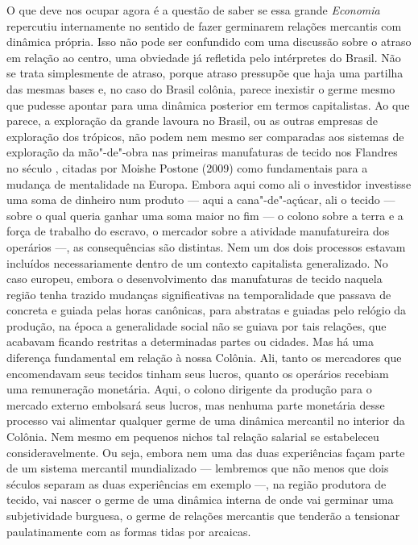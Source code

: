O que deve nos ocupar agora é a questão de saber se essa grande \emph{Economia}
repercutiu internamente no sentido de fazer germinarem relações
mercantis com dinâmica própria. Isso não pode ser confundido com uma
discussão sobre o atraso em relação ao centro, uma obviedade já
refletida pelo intérpretes do Brasil. Não se trata simplesmente de
atraso, porque atraso pressupõe que haja uma partilha das mesmas bases
e, no caso do Brasil colônia, parece inexistir o germe mesmo que pudesse
apontar para uma dinâmica posterior em termos capitalistas. Ao que
parece, a exploração da grande lavoura no Brasil, ou as outras empresas
de exploração dos trópicos, não podem nem mesmo ser comparadas aos
sistemas de exploração da mão"-de"-obra nas primeiras manufaturas de
tecido nos Flandres no século , citadas por Moishe Postone (2009)
como fundamentais para a mudança de mentalidade na Europa. Embora aqui
como ali o investidor investisse uma soma de dinheiro num produto ---
aqui a cana"-de"-açúcar, ali o tecido --- sobre o qual queria ganhar uma
soma maior no fim --- o colono sobre a terra e a força de trabalho do
escravo, o mercador sobre a atividade manufatureira dos operários ---, as
consequências são distintas. Nem um dos dois processos estavam incluídos
necessariamente dentro de um contexto capitalista generalizado. No caso
europeu, embora o desenvolvimento das manufaturas de tecido naquela
região tenha trazido mudanças significativas na temporalidade que
passava de concreta e guiada pelas horas canônicas, para abstratas e
guiadas pelo relógio da produção, na época a generalidade social não se
guiava por tais relações, que acabavam ficando restritas a determinadas
partes ou cidades. Mas há uma diferença fundamental em relação à nossa
Colônia. Ali, tanto os mercadores que encomendavam seus tecidos tinham
seus lucros, quanto os operários recebiam uma remuneração monetária.
Aqui, o colono dirigente da produção para o mercado externo embolsará
seus lucros, mas nenhuma parte monetária desse processo vai alimentar
qualquer germe de uma dinâmica mercantil no interior da Colônia. Nem
mesmo em pequenos nichos tal relação salarial se estabeleceu
consideravelmente. Ou seja, embora nem uma das duas experiências façam
parte de um sistema mercantil mundializado --- lembremos que não menos
que dois séculos separam as duas experiências em exemplo ---, na região
produtora de tecido, vai nascer o germe de uma dinâmica interna de onde
vai germinar uma subjetividade burguesa, o germe de relações mercantis
que tenderão a tensionar paulatinamente com as formas tidas por
arcaicas.

